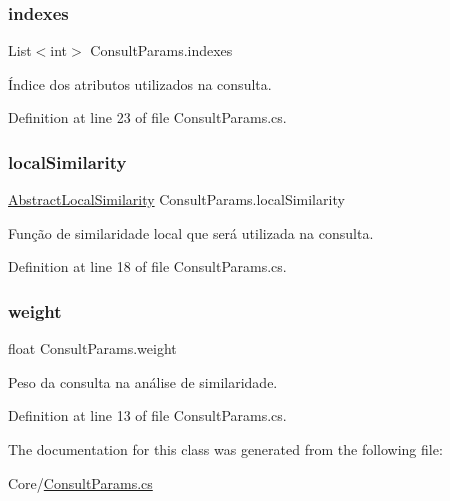 \subsubsection{\texorpdfstring{indexes}{indexes}}
{\footnotesize\ttfamily List$<$int$>$ Consult\+Params.\+indexes}



Índice dos atributos utilizados na consulta. 



Definition at line 23 of file Consult\+Params.\+cs.

\hypertarget{class_consult_params_a1910c45b23c7c0654518ba528d3e5a69}{}\label{class_consult_params_a1910c45b23c7c0654518ba528d3e5a69} 
\subsubsection{\texorpdfstring{local\+Similarity}{localSimilarity}}
{\footnotesize\ttfamily \hyperlink{class_abstract_local_similarity}{Abstract\+Local\+Similarity} Consult\+Params.\+local\+Similarity}



Função de similaridade local que será utilizada na consulta. 



Definition at line 18 of file Consult\+Params.\+cs.

\hypertarget{class_consult_params_aedab07a8d28bff47cbc569778533493e}{}\label{class_consult_params_aedab07a8d28bff47cbc569778533493e} 
\subsubsection{\texorpdfstring{weight}{weight}}
{\footnotesize\ttfamily float Consult\+Params.\+weight}



Peso da consulta na análise de similaridade. 



Definition at line 13 of file Consult\+Params.\+cs.



The documentation for this class was generated from the following file\+:\begin{DoxyCompactItemize}
\item 
Core/\hyperlink{_consult_params_8cs}{Consult\+Params.\+cs}\end{DoxyCompactItemize}
